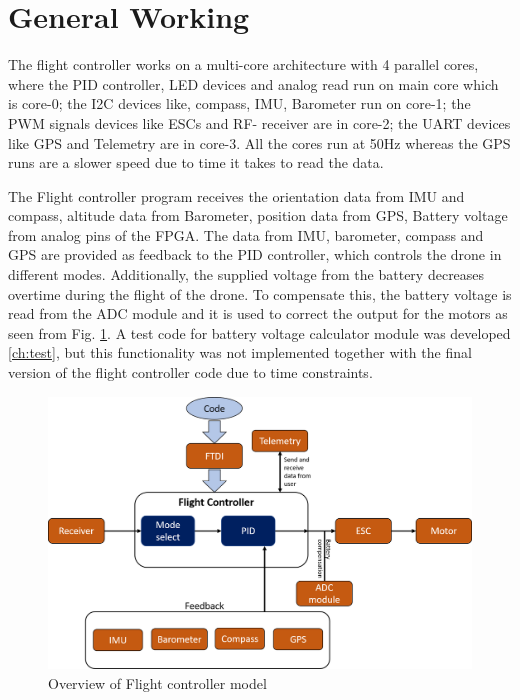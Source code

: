 \section{General Working}\label{sec:general_working}
The flight controller works on a multi-core architecture with 4 parallel cores, where the PID controller, LED devices and analog read run on main core which is core-0; the I2C devices like, compass, IMU, Barometer run on core-1; the PWM signals devices like ESCs and RF- receiver are in core-2; the UART devices like GPS and Telemetry are in core-3. All the cores run at 50Hz whereas the GPS runs are a slower speed due to time it takes to read the data.

The Flight controller program receives the orientation data from IMU and compass, altitude data from Barometer, position data from GPS, Battery voltage from analog pins of the FPGA. The data from IMU, barometer, compass and GPS are provided as feedback to the PID controller, which controls the drone in different modes. Additionally, the supplied voltage from the battery decreases overtime during the flight of the drone. To compensate this, the battery voltage is read from the ADC module and it is used to correct the output for the motors as seen from Fig. \ref{fig:flight_controller}. A test code for battery voltage calculator module was developed \ref{ch:test}, but this functionality was not implemented together with the final version of the flight controller code due to time constraints.

\begin{figure} [H]
    \centering
    \includegraphics[width=\textwidth]{Figures/implementation/flight_controller.png}
    \caption{Overview of Flight controller model}
    \label{fig:flight_controller}
\end{figure}

